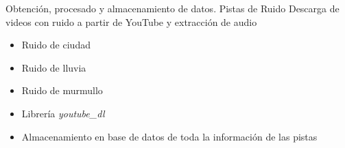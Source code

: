 \begin{frame}{Obtención, procesado y almacenamiento de datos. Pistas de Ruido}
	Descarga de videos con ruido a partir de YouTube y extracción de audio
	\begin{itemize}
		\item Ruido de ciudad
		\item Ruido de lluvia
		\item Ruido de murmullo
		\item Librería \textit{youtube\_dl}
		\item Almacenamiento en base de datos de toda la información de las pistas
	\end{itemize}
\end{frame}